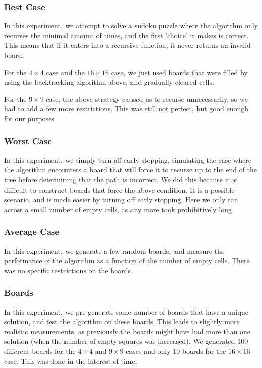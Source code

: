 \documentclass[16pt]{article}
\begin{document}
\subsubsection{Best Case}

In this experiment, we attempt to solve a sudoku puzzle where the algorithm only recurses the minimal amount of times, and the first 'choice' it makes is correct.
This means that if it enters into a recursive function, it never returns an invalid board.

For the $4 \times 4$ case and the $16 \times 16$ case, we just used boards that were filled by using the backtracking algorithm above, and gradually cleared cells.

For the $9 \times 9$ case, the above strategy caused us to recurse unnecessarily, so we had to add a few more restrictions. This was still not perfect, but good enough for our purposes.


\subsubsection{Worst Case}
In this experiment, we simply turn off early stopping, simulating the case where the algorithm encounters a board that will force it to recurse up to the end of the tree before determining that the path is incorrect.
We did this because it is difficult to construct boards that force the above condition. It is a possible scenario, and is made easier by turning off early stopping.
\newline
Here we only ran across a small number of empty cells, as any more took prohibitively long.


\subsubsection{Average Case}
In this experiment, we generate a few random boards, and measure the performance of the algorithm as a function of the number of empty cells.
There was no specific restrictions on the boards.

\subsubsection{Boards}
In this experiment, we pre-generate some number of boards that have a unique solution, and test the algorithm on these boards.
This leads to slightly more realistic measurements, as previously the boards might have had more than one solution (when the number of empty squares was increased).
\newline
We generated 100 different boards for the $4 \times 4$ and $9 \times 9$ cases and only 10 boards for the $16 \times 16$ case. This was done in the interest of time.
\end{document}
